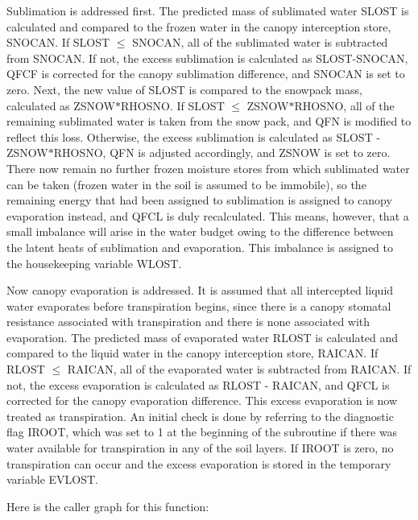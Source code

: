 Sublimation is addressed first. The predicted mass of sublimated water S\+L\+O\+S\+T is calculated and compared to the frozen water in the canopy interception store, S\+N\+O\+C\+A\+N. If S\+L\+O\+S\+T $\leq$ S\+N\+O\+C\+A\+N, all of the sublimated water is subtracted from S\+N\+O\+C\+A\+N. If not, the excess sublimation is calculated as S\+L\+O\+S\+T-\/\+S\+N\+O\+C\+A\+N, Q\+F\+C\+F is corrected for the canopy sublimation difference, and S\+N\+O\+C\+A\+N is set to zero. Next, the new value of S\+L\+O\+S\+T is compared to the snowpack mass, calculated as Z\+S\+N\+O\+W$\ast$\+R\+H\+O\+S\+N\+O. If S\+L\+O\+S\+T $\leq$ Z\+S\+N\+O\+W$\ast$\+R\+H\+O\+S\+N\+O, all of the remaining sublimated water is taken from the snow pack, and Q\+F\+N is modified to reflect this loss. Otherwise, the excess sublimation is calculated as S\+L\+O\+S\+T -\/ Z\+S\+N\+O\+W$\ast$\+R\+H\+O\+S\+N\+O, Q\+F\+N is adjusted accordingly, and Z\+S\+N\+O\+W is set to zero. There now remain no further frozen moisture stores from which sublimated water can be taken (frozen water in the soil is assumed to be immobile), so the remaining energy that had been assigned to sublimation is assigned to canopy evaporation instead, and Q\+F\+C\+L is duly recalculated. This means, however, that a small imbalance will arise in the water budget owing to the difference between the latent heats of sublimation and evaporation. This imbalance is assigned to the housekeeping variable W\+L\+O\+S\+T.

Now canopy evaporation is addressed. It is assumed that all intercepted liquid water evaporates before transpiration begins, since there is a canopy stomatal resistance associated with transpiration and there is none associated with evaporation. The predicted mass of evaporated water R\+L\+O\+S\+T is calculated and compared to the liquid water in the canopy interception store, R\+A\+I\+C\+A\+N. If R\+L\+O\+S\+T $\leq$ R\+A\+I\+C\+A\+N, all of the evaporated water is subtracted from R\+A\+I\+C\+A\+N. If not, the excess evaporation is calculated as R\+L\+O\+S\+T -\/ R\+A\+I\+C\+A\+N, and Q\+F\+C\+L is corrected for the canopy evaporation difference. This excess evaporation is now treated as transpiration. An initial check is done by referring to the diagnostic flag I\+R\+O\+O\+T, which was set to 1 at the beginning of the subroutine if there was water available for transpiration in any of the soil layers. If I\+R\+O\+O\+T is zero, no transpiration can occur and the excess evaporation is stored in the temporary variable E\+V\+L\+O\+S\+T. 

Here is the caller graph for this function\+:


